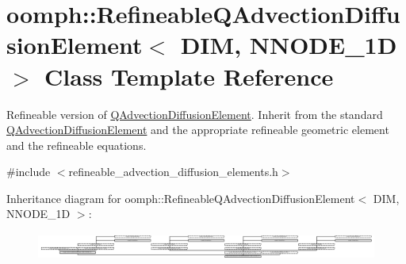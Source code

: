 \hypertarget{classoomph_1_1RefineableQAdvectionDiffusionElement}{}\section{oomph\+:\+:Refineable\+Q\+Advection\+Diffusion\+Element$<$ D\+IM, N\+N\+O\+D\+E\+\_\+1D $>$ Class Template Reference}
\label{classoomph_1_1RefineableQAdvectionDiffusionElement}


Refineable version of \hyperlink{classoomph_1_1QAdvectionDiffusionElement}{Q\+Advection\+Diffusion\+Element}. Inherit from the standard \hyperlink{classoomph_1_1QAdvectionDiffusionElement}{Q\+Advection\+Diffusion\+Element} and the appropriate refineable geometric element and the refineable equations.  




{\ttfamily \#include $<$refineable\+\_\+advection\+\_\+diffusion\+\_\+elements.\+h$>$}

Inheritance diagram for oomph\+:\+:Refineable\+Q\+Advection\+Diffusion\+Element$<$ D\+IM, N\+N\+O\+D\+E\+\_\+1D $>$\+:\begin{figure}[H]
\begin{center}
\leavevmode
\includegraphics[height=0.915033cm]{classoomph_1_1RefineableQAdvectionDiffusionElement}
\end{center}
\end{figure}
